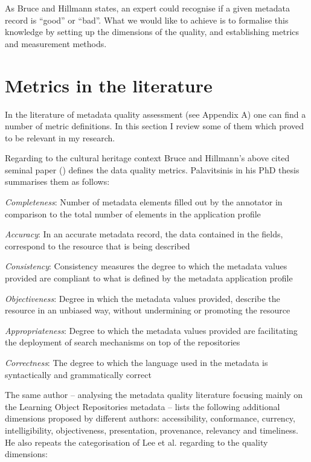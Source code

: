 
As Bruce and Hillmann states, an expert could recognise if a given metadata record is ``good'' or ``bad''. What we would like to achieve is to formalise this knowledge by setting up the dimensions of the quality, and establishing metrics and measurement methods.

\section{Metrics in the literature}

In the literature of metadata quality assessment (see Appendix A) one can find a number of metric definitions. In this section I review some of them which proved to be relevant in my research.

Regarding to the cultural heritage context Bruce and Hillmann's above cited seminal paper (\cite{bruce-hillmann2004}) defines the data quality metrics. Palavitsinis in his PhD thesis \cite{palavitsinis2014} summarises them as follows:

\emph{Completeness}: Number of metadata elements filled out by the annotator in comparison to the total number of elements in the application profile

\emph{Accuracy}: In an accurate metadata record, the data contained in the fields, correspond to the resource that is being described

\emph{Consistency}: Consistency measures the degree to which the metadata values provided are compliant to what is defined by the metadata application profile

\emph{Objectiveness}: Degree in which the metadata values provided, describe the resource in an unbiased way, without undermining or promoting the resource

\emph{Appropriateness}: Degree to which the metadata values provided are facilitating the deployment of search mechanisms on top of the repositories

\emph{Correctness}: The degree to which the language used in the metadata is syntactically and grammatically correct

The same author -- analysing the metadata quality literature focusing mainly on the Learning Object Repositories metadata -- lists the following additional dimensions proposed by different authors: accessibility, conformance, currency, intelligibility, objectiveness, presentation, provenance, relevancy and timeliness. He also repeats the categorisation of Lee et al. \cite{lee2002} regarding to the quality dimensions:

